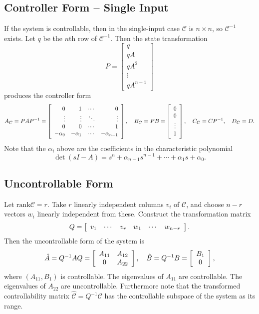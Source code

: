 \documentclass{report}
\begin{document}
\subsection{Controller Form -- Single Input}
If the system is controllable, then in the single-input case
$\mathcal{C}$ is $n \times n$, so $\mathcal{C}^{-1}$ exists. Let $q$
be the $n$th row of $\mathcal{C}^{-1}$. Then the state transformation
$$
P =
\left[\begin{array}{c}
  q        \\
  q A      \\
  q A^2    \\
  \vdots   \\
  q A^{n-1}
\end{array}\right]
$$
produces the controller form
$$
A_C = P A P^{-1} =
\left[\begin{array}{r r r r}
  0         & 1         & \cdots & 0      \\
  \vdots    & \vdots    & \ddots & \vdots \\
  0         & 0         & \cdots & 1      \\
  -\alpha_0 & -\alpha_1 & \cdots & -\alpha_{n-1}
\end{array}\right], \quad
B_C = PB =
\left[\begin{array}{c}
  0      \\
  0      \\
  \vdots \\
  1
\end{array}\right], \quad
C_C = CP^{-1}, \quad
D_C = D.
$$
Note that the $\alpha_i$ above are the coefficients in the
characteristic polynomial
$$
\det (sI - A) =
s^n + \alpha_{n-1} s^{n-1} + \cdots + \alpha_1 s + \alpha_0.
$$

\subsection{Uncontrollable Form }
Let $\mathrm{rank} \mathcal{C} = r$. Take $r$ linearly independent
columns $v_i$ of $\mathcal{C}$, and choose $n - r$ vectors $w_i$ linearly
independent from these. Construct the transformation matrix
$$
Q =
\left[\begin{array}{c c c c c c}
  v_1 & \cdots & v_r & w_1 & \cdots & w_{n-r} \\
\end{array}\right].
$$
Then the uncontrollable form of the system is
$$
\hat{A} = Q^{-1} A Q =
\left[\begin{array}{c c}
  A_{11} & A_{12} \\
  0     & A_{22}
\end{array}\right], \quad
\hat{B} = Q^{-1} B =
\left[\begin{array}{c}
  B_1 \\
  0
\end{array}\right],
$$
where $(A_{11}, B_1)$ is controllable. The eigenvalues of $A_{11}$ are
controllable. The eigenvalues of $A_{22}$ are uncontrollable.
Furthermore note that the transformed controllability
matrix $\hat{\mathcal{C}} = Q^{-1} \mathcal{C}$ has the controllable
subspace of the system as its range.
\end{document}
